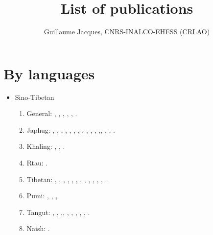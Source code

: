 \documentclass[oldfontcommands,oneside,a4paper,11pt]{article}
\begin{document}
 

  \title{List of publications}
 
\author{Guillaume Jacques, CNRS-INALCO-EHESS (CRLAO)}
\maketitle
\sloppy
 
\section{By languages}
\begin{itemize}
\item Sino-Tibetan
\begin{enumerate}
\item General: \citet{jacques03s.houzhui}, \citet{jacques06morpho}, \citet{jacques07chang}, \citet{antonov12kumush}, \citet{jacques12agreement},    \citet{michaud-jacques12nasalite}.     
\item Japhug:  \citet{jacques04redupl},     \citet{jacques04these},   \citet{jacques07passif},  \citet{jacques07redupl}, \citet{jacques08},  \citet{jacques10gesar}, \citet{jacques10refl},  \citet{jacques10inverse},  \citet{jacques12incorp},   \citet{jacques12demotion},  \citet{jacques13harmonization},  \citet{jacques13tropative},\citet{jacques14antipassive}, \citet{japhug14ideophones}, \citet{jacques14inverse}, \citet{jacques14linking}.
\item Khaling: \citet{jacques12khaling},  \citet{jacques13derivational.khaling}, \citet{jacques14auditory}.
\item Rtau: \citet{antonov14rtau}.
\item Tibetan:  \citet{jacques01dg}, \citet{jacques04thimphu}, \citet{jacques07naksatram},      \citet{jacques08debther},  \citet{jacques09wazur}, \citet{jacques09e},  \citet{jacques10zos},   \citet{jacques10ndr},  \citet{jacques11lingua},  \citet{jacques12internal},  \citet{jacques12transcription}, \citet{jacques13yod}, \citet{jacques14snom}.
\item Pumi:  \citet{michaud10bonin}, \citet{jacques11pumi.tone}, \citet{jacques11lingua}, 
\item Tangut: \citet{jacques06comparaison},  \citet{jacques07textes}, \citet{jacques08weiyu},\citet{jacques08alternations},   \citet{jacques09tangutverb},  \citet{jacques10imperial},  \citet{jacques11tangut.verb}, \citet{jacques11ngwemi}, \citet{jacques11kinship},  \citet{jacques14esquisse}.
\item Naish: \citet{jacques.michaud11naish}.

\end{enumerate}
\end{itemize}
\end{document}
